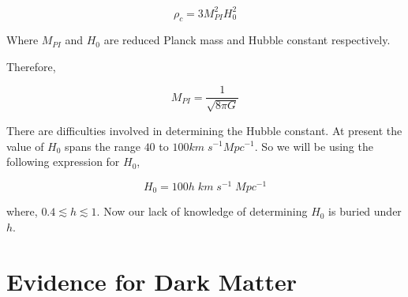 \documentclass[12pt]{report}
\begin{document}
\begin{equation}
\rho_c =  3 M^2_{PI} H^2_0
\end{equation}

Where $M_{PI}$ and $H_0$ are reduced Planck mass and Hubble constant respectively.

Therefore,

$$M_{PI}= \frac{1}{\sqrt{8 \pi G}}$$

There are difficulties involved in determining the Hubble constant. At present the value of $H_0$ spans the range $40$ to $100 km\;s^{-1} Mpc^{-1}$. So we will be using the following expression for $H_0$,

\begin{equation}
H_0= 100h \; km\; s^{-1}\; Mpc^{-1}
\end{equation}

where, $0.4 \lesssim h \lesssim 1$. Now our lack of knowledge of determining $H_0$ is buried under $h$.\\

\newpage



\section{Evidence for Dark Matter}

\end{document}
